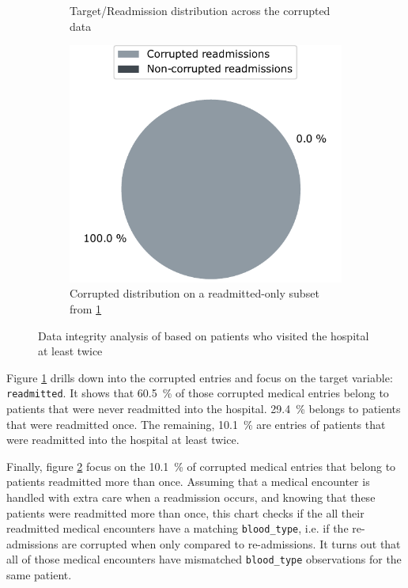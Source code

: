 \documentclass[a4paper,11pt]{article}
\newcommand{\bloodType}{\texttt{blood\_type}\xspace}
\newcommand{\readmitted}{\texttt{readmitted}\xspace}
\begin{document}
\begin{figure}[H]
\begin{subfigure}{0.32\textwidth}
    \caption{Target/Readmission distribution across the corrupted data}
    \label{fig:duplicated_patients_second}
\end{subfigure}
\hfill
\begin{subfigure}{0.32\textwidth}
    \includegraphics[width=\textwidth]{images/week1_pie3.pdf}
    \caption{Corrupted distribution on a readmitted-only subset from \ref{fig:duplicated_patients_second}}
    \label{fig:duplicated_patients_third}
\end{subfigure}
        
\caption{Data integrity analysis of based on patients who visited the hospital at least twice}
\label{fig:duplicated_patients}
\end{figure}

Figure \ref{fig:duplicated_patients_second} drills down into the corrupted entries and focus on the target variable: \readmitted. It shows that \SI{60.5}{\percent} of those corrupted medical entries belong to patients that were never readmitted into the hospital. \SI{29.4}{\percent} belongs to patients that were readmitted once. The remaining, \SI{10.1}{\percent} are entries of patients that were readmitted into the hospital at least twice.

Finally, figure \ref{fig:duplicated_patients_third} focus on the \SI{10.1}{\percent} of corrupted medical entries that belong to patients readmitted more than once. 
Assuming that a medical encounter is handled with extra care when a readmission occurs, and knowing that these patients were readmitted more than once, this chart checks if the all their readmitted medical encounters have a matching \bloodType, i.e. if the re-admissions are corrupted when only compared to re-admissions.
It turns out that all of those medical encounters have mismatched \bloodType observations for the same patient. 
\end{document}
